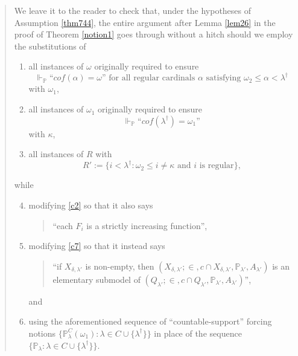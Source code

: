 \documentclass[12pt, twoside]{memoir}
\numberwithin{equation}{section}
\theoremstyle{definition}
\theoremstyle{remark}
\theoremstyle{definition}
\theoremstyle{definition}
\theoremstyle{definition}
\theoremstyle{remark}
\begin{document}
\begin{quote}
We leave it to the reader to check that, under the hypotheses of Assumption \ref{thm744}, the entire argument after Lemma \ref{lem26} in the proof of Theorem \ref{notion1} goes through without a hitch should we employ the substitutions of
\begin{enumerate}[label=(\arabic*)]
    \item all instances of $\omega$ originally required to ensure 
    \begin{equation*}
        \Vdash_{\mathbb{P}} \text{``} cof(\alpha) = \omega \text{''} \text{ for all regular cardinals } \alpha \text{ satisfying } \omega_2 \leq \alpha < \lambda^{\dagger}
    \end{equation*}
    with $\omega_1$,
    \item all instances of $\omega_1$ originally required to ensure
    \begin{equation*}
        \Vdash_{\mathbb{P}} \text{``} cof(\lambda^{\dagger}) = \omega_1 \text{''}
    \end{equation*}
    with $\kappa$, 
    \item all instances of $R$ with 
    \begin{equation*}
        R' := \{i < \lambda^{\dagger} : \omega_2 \leq i \neq \kappa \text{ and } i \text{ is regular} \} \text{,}
    \end{equation*}
\end{enumerate}
while
\begin{enumerate}[label=(\arabic*)]
    \setcounter{enumi}{3}
    \item modifying \ref{c2} so that it also says
    \begin{quote}
        ``each $F_i$ is a strictly increasing function'',
    \end{quote}
    \item\label{7444} modifying \ref{c7} so that it instead says
    \begin{quote}
        ``if $X_{\delta, \lambda'}$ is non-empty, then $(X_{\delta, \lambda'}; \in, c \cap X_{\delta, \lambda'}, \mathbb{P}_{\lambda'}, A_{\lambda'})$ is an elementary submodel of $(Q_{\lambda'}; \in, c \cap Q_{\lambda'}, \mathbb{P}_{\lambda'}, A_{\lambda'})$'',
    \end{quote}
    and
    \item\label{7445} using the aforementioned sequence of ``countable-support'' forcing notions $\{\mathbb{P}^C_{\lambda}(\omega_1) : \lambda \in C \cup \{\lambda^{\dagger}\}\}$ in place of the sequence $\{\mathbb{P}_{\lambda} : \lambda \in C \cup \{\lambda^{\dagger}\}\}$.
\end{enumerate}


\end{quote}
\end{document}
